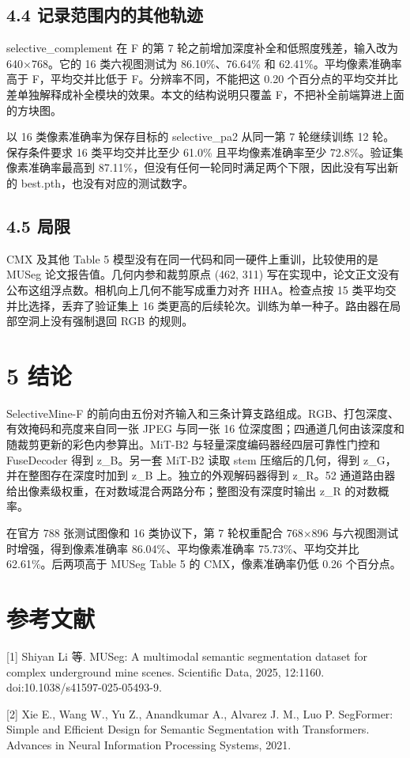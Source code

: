 \documentclass[UTF8,a4paper,11pt]{ctexart}
\begin{document}
\subsection*{4.4 记录范围内的其他轨迹}
selective\_complement 在 F 的第 7 轮之前增加深度补全和低照度残差，输入改为 640×768。它的 16 类六视图测试为 86.10\%、76.64\% 和 62.41\%。平均像素准确率高于 F，平均交并比低于 F。分辨率不同，不能把这 0.20 个百分点的平均交并比差单独解释成补全模块的效果。本文的结构说明只覆盖 F，不把补全前端算进上面的方块图。

以 16 类像素准确率为保存目标的 selective\_pa2 从同一第 7 轮继续训练 12 轮。保存条件要求 16 类平均交并比至少 61.0\% 且平均像素准确率至少 72.8\%。验证集像素准确率最高到 87.11\%，但没有任何一轮同时满足两个下限，因此没有写出新的 best.pth，也没有对应的测试数字。

\subsection*{4.5 局限}
CMX 及其他 Table 5 模型没有在同一代码和同一硬件上重训，比较使用的是 MUSeg 论文报告值。几何内参和裁剪原点 (462, 311) 写在实现中，论文正文没有公布这组浮点数。相机向上几何不能写成重力对齐 HHA。检查点按 15 类平均交并比选择，丢弃了验证集上 16 类更高的后续轮次。训练为单一种子。路由器在局部空洞上没有强制退回 RGB 的规则。

\section*{5 结论}
SelectiveMine-F 的前向由五份对齐输入和三条计算支路组成。RGB、打包深度、有效掩码和亮度来自同一张 JPEG 与同一张 16 位深度图；四通道几何由该深度和随裁剪更新的彩色内参算出。MiT-B2 与轻量深度编码器经四层可靠性门控和 FuseDecoder 得到 z\_B。另一套 MiT-B2 读取 stem 压缩后的几何，得到 z\_G，并在整图存在深度时加到 z\_B 上。独立的外观解码器得到 z\_R。52 通道路由器给出像素级权重，在对数域混合两路分布；整图没有深度时输出 z\_R 的对数概率。

在官方 788 张测试图像和 16 类协议下，第 7 轮权重配合 768×896 与六视图测试时增强，得到像素准确率 86.04\%、平均像素准确率 75.73\%、平均交并比 62.61\%。后两项高于 MUSeg Table 5 的 CMX，像素准确率仍低 0.26 个百分点。

\section*{参考文献}
[1] Shiyan Li 等. MUSeg: A multimodal semantic segmentation dataset for complex underground mine scenes. Scientific Data, 2025, 12:1160. doi:10.1038/s41597-025-05493-9.

[2] Xie E., Wang W., Yu Z., Anandkumar A., Alvarez J. M., Luo P. SegFormer: Simple and Efficient Design for Semantic Segmentation with Transformers. Advances in Neural Information Processing Systems, 2021.
\end{document}
